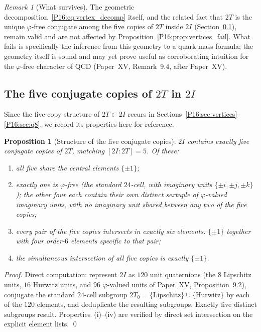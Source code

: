 \documentclass[11pt,a4paper]{article}
\newtheorem{proposition}[theorem]{Proposition}
\theoremstyle{definition}\newtheorem{definition}[theorem]{Definition}
\theoremstyle{remark}
\newtheorem{remark}[theorem]{Remark}
\theoremstyle{definition}\newtheorem{construction}[theorem]{Construction}
\newcommand{\vp}{\varphi}
\newcommand{\twoI}{2I}
\newcommand{\twoT}{2T}
\begin{document}
\begin{remark}[What survives]
\label{P16:rem:what_survives}
The geometric decomposition~\eqref{P16:eq:vertex_decomp} itself, and the
related fact that $\twoT$ is the unique $\vp$-free conjugate among the
five copies of $\twoT$ inside $\twoI$ (Section~\ref{P16:sec:5copies}),
remain valid and are not affected by Proposition~\ref{P16:prop:vertices_fail}.
What fails is specifically the inference from this geometry to a
quark mass formula; the geometry itself is sound and may yet prove
useful as corroborating intuition for the $\vp$-free character of QCD
(Paper~XV, Remark~9.4, after Paper~XV).
\end{remark}

\subsection{The five conjugate copies of $\twoT$ in $\twoI$}
\label{P16:sec:5copies}

Since the five-copy structure of $\twoT\subset\twoI$ recurs in
Sections~\ref{P16:sec:vertices}--\ref{P16:sec:q8}, we record its properties
here for reference.

\begin{proposition}[Structure of the five conjugate copies]
\label{P16:prop:five_copies}
$\twoI$ contains exactly five conjugate copies of $\twoT$, matching
$[\twoI{:}\twoT]=5$. Of these:
\begin{enumerate}[label=(\roman*)]
\item all five share the central elements $\{\pm1\}$;
\item exactly one is $\vp$-free (the standard $24$-cell, with
  imaginary units $\{\pm i,\pm j,\pm k\}$); the other four each
  contain their own distinct sextuple of $\vp$-valued imaginary units,
  with no imaginary unit shared between any two of the five copies;
\item every pair of the five copies intersects in exactly six
  elements: $\{\pm1\}$ together with four order-$6$ elements specific
  to that pair;
\item the simultaneous intersection of all five copies is exactly
  $\{\pm1\}$.
\end{enumerate}
\end{proposition}

\begin{proof}
Direct computation: represent $\twoI$ as $120$ unit quaternions (the
$8$ Lipschitz units, $16$ Hurwitz units, and $96$ $\vp$-valued units
of Paper~XV, Proposition~9.2), conjugate the standard $24$-cell
subgroup $\twoT_0=\{\text{Lipschitz}\}\cup\{\text{Hurwitz}\}$ by each
of the $120$ elements, and deduplicate the resulting subgroups. Exactly
five distinct subgroups result. Properties~(i)--(iv) are verified by
direct set intersection on the explicit element lists.
\qed
\end{proof}
\end{document}
